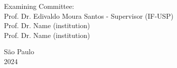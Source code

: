 \begin{titlepage}
\noindent Examining Committee: \\
\noindent Prof. Dr. Edivaldo Moura Santos - Supervisor (IF-USP)\\
Prof. Dr. Name (institution)\\
Prof. Dr. Name (institution)\\
\vspace{2.5cm}


\centering
    {São Paulo \\  2024}
\clearpage
\end{titlepage}